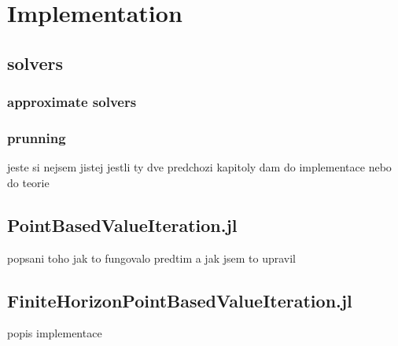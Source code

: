 
\chapter{Implementation}


\section{solvers}

\subsection{approximate solvers}

\subsection{prunning}

jeste si nejsem jistej jestli ty dve predchozi kapitoly dam do implementace nebo do teorie

\section{PointBasedValueIteration.jl}
popsani toho jak to fungovalo predtim a jak jsem to upravil

\section{FiniteHorizonPointBasedValueIteration.jl}
popis implementace
